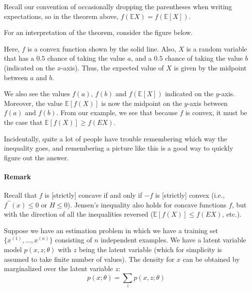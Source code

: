 Recall our convention of occasionally dropping the parentheses when writing
expectations, so in the theorem above, $f(\mathbb E X) = f(\mathbb E[X])$.

For an interpretation of the theorem, consider the figure below.

Here, $f$ is a convex function shown by the solid line. Also, $X$ is a random
variable that has a $0.5$ chance of taking the value $a$, and a $0.5$ chance of
taking the value $b$ (indicated on the $x$-axis). Thus, the expected value of $X$
is given by the midpoint between $a$ and $b$.

We also see the values $f(a)$, $f(b)$ and $f(\mathbb E[X])$ indicated on the $y$-axis.
Moreover, the value $\mathbb E[f(X)]$ is now the midpoint on the $y$-axis between $f(a)$
and $f(b)$. From our example, we see that because $f$ is convex, it must be the
case that $\mathbb E[f(X)] \ge f(EX)$.

Incidentally, quite a lot of people have trouble remembering which way
the inequality goes, and remembering a picture like this is a good way to
quickly figure out the answer.

\paragraph{Remark} Recall that $f$ is [strictly] concave if and only if $-f$ is [strictly]
convex (i.e., $f^{\prime\prime}(x) \le 0$ or $H \le 0$). Jensen's inequality also holds for concave
functions $f$, but with the direction of all the inequalities reversed ($\mathbb E[f(X)] \le
f(EX)$, etc.).

\vspace{1cm}
\label{cha:em_alg}
Suppose we have an estimation problem in which we have a training set
$\{x^{(1)} ,\ldots,x^{(n)}\}$ consisting of $n$ independent examples. We have a latent
variable model $p(x,z;\theta)$ with $z$ being the latent variable (which for simplicity is
assumed to take finite number of values). The density for $x$ can be obtained
by marginalized over the latent variable $z$:
\begin{equation}
    p(x;\theta) = \sum_{z} p(x,z;\theta)
\end{equation}

